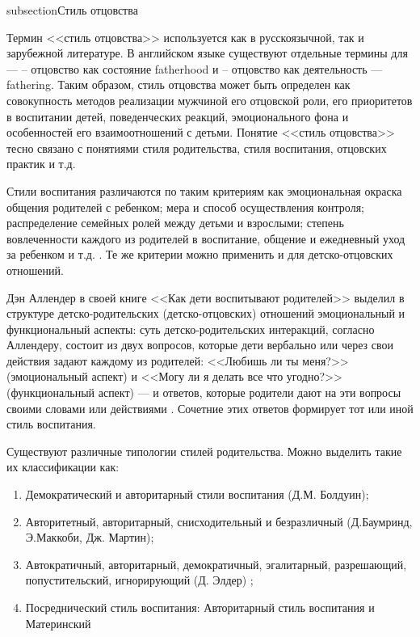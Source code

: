 \documentclass{../../common/thesisbyxetex}
\begin{document}
subsection{Стиль отцовства}



Термин <<стиль отцовства>> используется как в русскоязычной, так и зарубежной литературе. В
английском языке существуют  отдельные термины для ---  -- отцовство как
состояние fatherhood и  -- отцовство как деятельность  --- fathering. Таким образом, стиль отцовства
может быть определен как совокупность методов реализации мужчиной
его отцовской роли, его приоритетов в воспитании детей, поведенческих реакций, эмоционального фона
и особенностей его взаимоотношений с детьми.
Понятие <<стиль отцовства>> тесно связано с понятиями стиля родительства, стиля
воспитания, отцовских практик  и т.д.


Стили воспитания различаются по таким критериям как эмоциональная окраска общения родителей с
ребенком; мера и способ осуществления контроля; распределение семейных ролей между детьми и
взрослыми; степень вовлеченности каждого из родителей в воспитание, общение и ежедневный уход за
ребенком и т.д. \cite{stil}. Те же критерии можно применить и для детско-отцовских отношений.

Дэн Аллендер в своей книге <<Как дети воспитывают родителей>> выделил в структуре
детско-родительских (детско-отцовских) отношений эмоциональный и функциональный аспекты: суть
детско-родительских
интеракций, согласно Аллендеру, состоит из двух вопросов, которые дети вербально или
через свои действия задают каждому из родителей: <<Любишь ли ты меня?>> (эмоциональный аспект) и
<<Могу ли я делать все что угодно?>> (функциональный аспект) --- и ответов, которые родители
дают на эти вопросы своими словами или действиями \cite{den}. Сочетние этих ответов формирует тот
или иной стиль воспитания.



Существуют различные типологии стилей родительства. Можно выделить такие их классификации как:

\begin{enumerate}
	\item Демократический и авторитарный стили воспитания (Д.М. Болдуин);
	\item Авторитетный, авторитарный, снисходительный и безразличный (Д.Баумринд, Э.Маккоби, Дж.
Мартин);
	\item Автократичный, авторитарный, демократичный, эгалитарный, разрешающий, попустительский,
игнорирующий (Д. Элдер) \cite{stil};
	\item Посреднический стиль воспитания: Авторитарный стиль воспитания и Материнский
\cite[281]{strat}
\end{enumerate}
\end{document}
